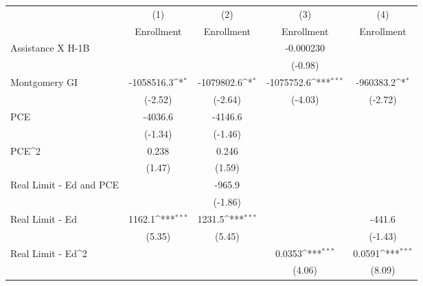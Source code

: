 {
\def\sym#1{\ifmmode^{#1}\else\(^{#1}\)\fi}
\begin{tabular}{l*{4}{c}}
\hline\hline
                         &\multicolumn{1}{c}{(1)}&\multicolumn{1}{c}{(2)}&\multicolumn{1}{c}{(3)}&\multicolumn{1}{c}{(4)}\\
                         &\multicolumn{1}{c}{Enrollment}&\multicolumn{1}{c}{Enrollment}&\multicolumn{1}{c}{Enrollment}&\multicolumn{1}{c}{Enrollment}\\
\hline
Assistance X H-1B        &                     &                     &   -0.000230         &                     \\
                         &                     &                     &     (-0.98)         &                     \\
[1em]
Montgomery GI            &  -1058516.3\sym{*}  &  -1079802.6\sym{*}  &  -1075752.6\sym{***}&   -960383.2\sym{*}  \\
                         &     (-2.52)         &     (-2.64)         &     (-4.03)         &     (-2.72)         \\
[1em]
PCE                      &     -4036.6         &     -4146.6         &                     &                     \\
                         &     (-1.34)         &     (-1.46)         &                     &                     \\
[1em]
PCE^2                    &       0.238         &       0.246         &                     &                     \\
                         &      (1.47)         &      (1.59)         &                     &                     \\
[1em]
Real Limit - Ed and PCE  &                     &      -965.9         &                     &                     \\
                         &                     &     (-1.86)         &                     &                     \\
[1em]
Real Limit - Ed          &      1162.1\sym{***}&      1231.5\sym{***}&                     &      -441.6         \\
                         &      (5.35)         &      (5.45)         &                     &     (-1.43)         \\
[1em]
Real Limit - Ed^2        &                     &                     &      0.0353\sym{***}&      0.0591\sym{***}\\
                         &                     &                     &      (4.06)         &      (8.09)         \\

\end{tabular}}
